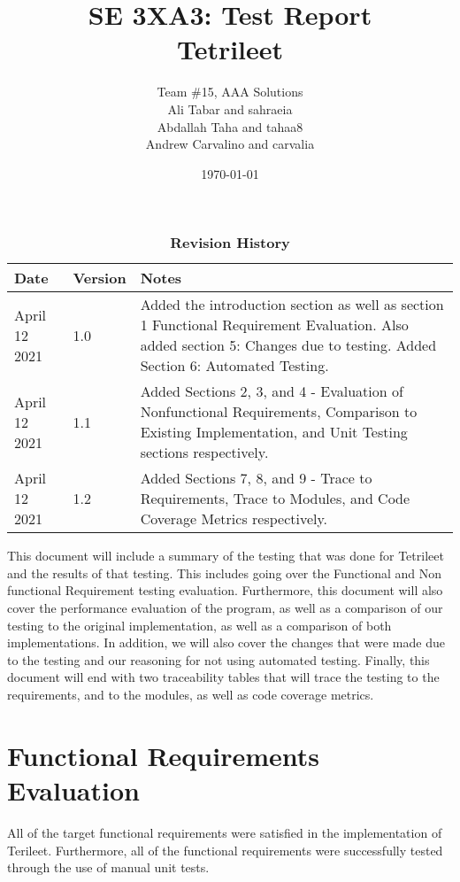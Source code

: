 \documentclass[12pt, titlepage]{article}
\title{SE 3XA3: Test Report\\Tetrileet}
\author{Team \#15, AAA Solutions
		\\ Ali Tabar and sahraeia
		\\ Abdallah Taha and tahaa8
		\\ Andrew Carvalino and carvalia
}
\date{\today}
\begin{document}
\maketitle

\tableofcontents
\listoftables
\listoffigures

\begin{table}[h!]
\caption{\bf Revision History}
\begin{tabularx}{\textwidth}{p{3cm}p{2cm}X}
\toprule {\bf Date} & {\bf Version} & {\bf Notes}\\
\midrule
April 12 2021 & 1.0 & Added the introduction section as well as section 1 Functional Requirement Evaluation. Also added section 5: Changes due to testing. Added Section 6: Automated Testing.\\
April 12 2021 & 1.1 & Added Sections 2, 3, and 4 - Evaluation of Nonfunctional Requirements, Comparison to Existing Implementation, and Unit Testing sections respectively.\\
April 12 2021 & 1.2 & Added Sections 7, 8, and 9 - Trace to Requirements, Trace to Modules, and Code Coverage Metrics respectively.\\
\bottomrule
\end{tabularx}
\end{table}

\newpage

This document will include a summary of the testing that was done for Tetrileet and the results of that testing. This includes going over the Functional and Non functional Requirement testing evaluation. Furthermore, this document will also cover the performance evaluation of the program, as well as a comparison of our testing to the original implementation, as well as a comparison of both implementations. In addition, we will also cover the changes that were made due to the testing and our reasoning for not using automated testing. Finally, this document will end with two traceability tables that will trace the testing to the requirements, and to the modules, as well as code coverage metrics. 
\newpage
\section{Functional Requirements Evaluation}
All of the target functional requirements were satisfied in the implementation of Terileet. Furthermore, all of the functional requirements were successfully tested through the use of manual unit tests.
\end{document}
